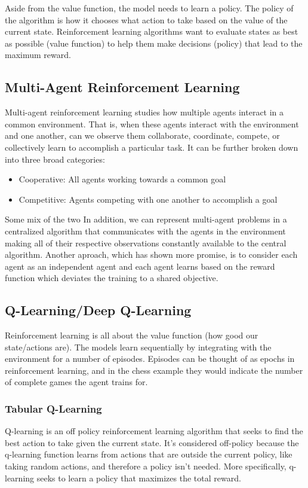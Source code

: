 \documentclass[conference]{IEEEtran}
\begin{document}
Aside from the value function, the model needs to learn a policy.
The policy of the algorithm is how it chooses what action to take based on the value of the current state.
Reinforcement learning algorithms want to evaluate states as best as possible (value function) to help them make decisions (policy) that lead to the maximum reward.
\subsection{Multi-Agent Reinforcement Learning}
Multi-agent reinforcement learning studies how multiple agents interact in a common environment. That is, when these agents interact with the environment and one another, can we observe them collaborate, coordinate, compete, or collectively learn to accomplish a particular task. It can be further broken down into three broad categories:
\begin{itemize}
    \item Cooperative: All agents working towards a common goal
    \item Competitive: Agents competing with one another to accomplish a goal
\end{itemize}

Some mix of the two In addition, we can represent multi-agent problems in a centralized algorithm that communicates with the agents in the environment making all of their respective observations constantly available to the central algorithm. Another aproach, which has shown more promise, is to consider each agent as an independent agent and each agent learns based on the reward function which deviates the training to a shared objective.
\subsection{Q-Learning/Deep Q-Learning}
Reinforcement learning is all about the value function (how good our state/actions are). The models learn sequentially by integrating with the environment for a number of episodes. Episodes can be thought of as epochs in reinforcement learning, and in the chess example they would indicate the number of complete games the agent trains for.
\subsubsection{Tabular Q-Learning}
Q-learning is an off policy reinforcement learning algorithm that seeks to find the best action to take given the current state. It's considered off-policy because the q-learning function learns from actions that are outside the current policy, like taking random actions, and therefore a policy isn't needed. More specifically, q-learning seeks to learn a policy that maximizes the total reward.
\end{document}
